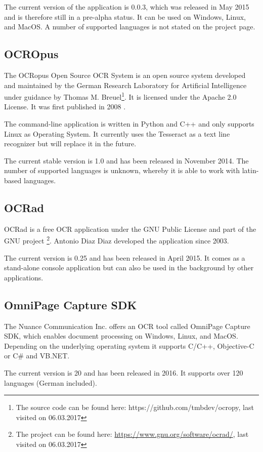 The current version of the application is 0.0.3, which was released in May 2015 and is therefore still in a pre-alpha status. It can be used on Windows, Linux, and MacOS. A number of supported languages is not stated on the project page.

\subsection{OCROpus}
\label{sec3.1.7}
The OCRopus Open Source OCR System is an open source system developed and maintained by the German Research Laboratory for Artificial Intelligence under guidance by Thomas M. Breuel\footnote{The source code can be found here: https://github.com/tmbdev/ocropy, last visited on 06.03.2017}. It is licensed under the Apache 2.0 License. It was first published in 2008 \cite{Breuel08}.

The command-line application is written in Python and C++ and only supports Linux as Operating System. It currently uses the Tesseract as a text line recognizer but will replace it in the future. 

The current stable version is 1.0 and has been released in November 2014. The number of supported languages is unknown, whereby it is able to work with latin-based languages.

\label{OCRad}
\subsection{OCRad}
OCRad is a free OCR application under the GNU Public License and part of the GNU project \footnote{The project can be found here: \url{https://www.gnu.org/software/ocrad/}, last visited on 06.03.2017}. Antonio Diaz Diaz developed the application since 2003.

The current version is 0.25 and has been released in April 2015. It comes as a stand-alone console application but can also be used in the background by other applications.

\label{OmniPage}
\subsection{OmniPage Capture SDK}
The Nuance Communication Inc. offers an OCR tool called OmniPage Capture SDK, which enables document processing on Windows, Linux, and MacOS. Depending on the underlying operating system it supports C/C++, Objective-C or C\# and VB.NET.

The current version is 20 and has been released in 2016. It supports over 120 languages (German included).

